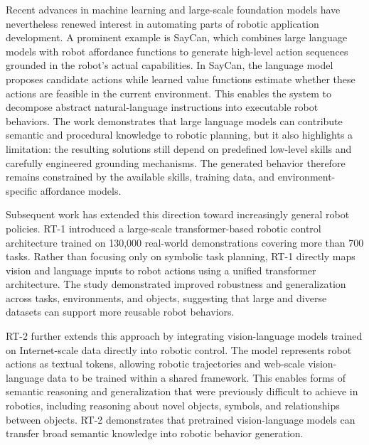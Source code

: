 Recent advances in machine learning and large-scale foundation models have nevertheless renewed interest in automating parts of robotic application development. A prominent example is SayCan, which combines large language models with robot affordance functions to generate high-level action sequences grounded in the robot's actual capabilities. \cite{brohan2023can} In SayCan, the language model proposes candidate actions while learned value functions estimate whether these actions are feasible in the current environment. This enables the system to decompose abstract natural-language instructions into executable robot behaviors. The work demonstrates that large language models can contribute semantic and procedural knowledge to robotic planning, but it also highlights a limitation: the resulting solutions still depend on predefined low-level skills and carefully engineered grounding mechanisms. The generated behavior therefore remains constrained by the available skills, training data, and environment-specific affordance models.

Subsequent work has extended this direction toward increasingly general robot policies. RT-1 introduced a large-scale transformer-based robotic control architecture trained on 130,000 real-world demonstrations covering more than 700 tasks. \cite{brohan2022rt1} Rather than focusing only on symbolic task planning, RT-1 directly maps vision and language inputs to robot actions using a unified transformer architecture. The study demonstrated improved robustness and generalization across tasks, environments, and objects, suggesting that large and diverse datasets can support more reusable robot behaviors.

RT-2 further extends this approach by integrating vision-language models trained on Internet-scale data directly into robotic control. \cite{zitkovich2023rt2} The model represents robot actions as textual tokens, allowing robotic trajectories and web-scale vision-language data to be trained within a shared framework. This enables forms of semantic reasoning and generalization that were previously difficult to achieve in robotics, including reasoning about novel objects, symbols, and relationships between objects. RT-2 demonstrates that pretrained vision-language models can transfer broad semantic knowledge into robotic behavior generation.

